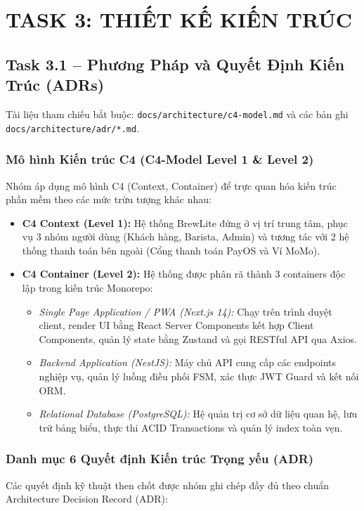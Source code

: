 \documentclass[11pt,a4paper]{article}
\begin{document}
\section{TASK 3: THIẾT KẾ KIẾN TRÚC}

\subsection{Task 3.1 -- Phương Pháp và Quyết Định Kiến Trúc (ADRs)}

Tài liệu tham chiếu bắt buộc: \texttt{docs/architecture/c4-model.md} và các bản ghi \texttt{docs/architecture/adr/*.md}.

\subsubsection{Mô hình Kiến trúc C4 (C4-Model Level 1 \& Level 2)}
Nhóm áp dụng mô hình C4 (Context, Container) để trực quan hóa kiến trúc phần mềm theo các mức trừu tượng khác nhau:
\begin{itemize}[leftmargin=*]
    \item \textbf{C4 Context (Level 1):} Hệ thống BrewLite đứng ở vị trí trung tâm, phục vụ 3 nhóm người dùng (Khách hàng, Barista, Admin) và tương tác với 2 hệ thống thanh toán bên ngoài (Cổng thanh toán PayOS và Ví MoMo).
    \item \textbf{C4 Container (Level 2):} Hệ thống được phân rã thành 3 containers độc lập trong kiến trúc Monorepo:
    \begin{itemize}[leftmargin=*,noitemsep]
        \item \textit{Single Page Application / PWA (Next.js 14):} Chạy trên trình duyệt client, render UI bằng React Server Components kết hợp Client Components, quản lý state bằng Zustand và gọi RESTful API qua Axios.
        \item \textit{Backend Application (NestJS):} Máy chủ API cung cấp các endpoints nghiệp vụ, quản lý luồng điều phối FSM, xác thực JWT Guard và kết nối ORM.
        \item \textit{Relational Database (PostgreSQL):} Hệ quản trị cơ sở dữ liệu quan hệ, lưu trữ bảng biểu, thực thi ACID Transactions và quản lý index toàn vẹn.
    \end{itemize}
\end{itemize}

\subsubsection{Danh mục 6 Quyết định Kiến trúc Trọng yếu (ADR)}
Các quyết định kỹ thuật then chốt được nhóm ghi chép đầy đủ theo chuẩn Architecture Decision Record (ADR):
\clearpage
\end{document}
